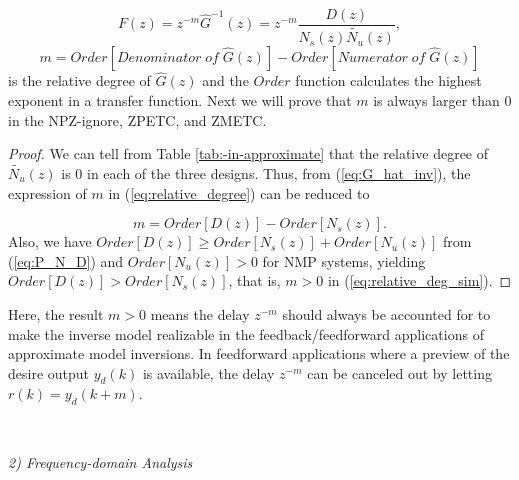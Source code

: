 \documentclass [11pt, proquest] {uwthesis}[2020/02/24]
\begin{document}
\begin{equation}
F(z)=z^{-m}\hat{G}^{-1}(z)=z^{-m}\frac{D(z)}{N_{s}(z)\tilde{N_{u}}(z)},\label{eq:P_hat_inv}
\end{equation}
\begin{equation}
m=Order[Denominator\;of\;\hat{G}(z)]-Order[Numerator\;of\;\hat{G}(z)]\label{eq:relative_degree}
\end{equation}
is the relative degree of $\hat{G}(z)$ and the $Order$ function
calculates the highest exponent in a transfer function. Next we will
prove that $m$ is always larger than 0 in the NPZ-ignore, ZPETC,
and ZMETC.
\begin{proof}
We can tell from Table \ref{tab:-in-approximate} that the relative
degree of $\tilde{N_{u}}(z)$ is 0 in each of the three designs. Thus,
from (\ref{eq:G_hat_inv}), the expression of $m$ in (\ref{eq:relative_degree})
can be reduced to

\begin{equation}
m=Order[D(z)]-Order[N_{s}(z)].\label{eq:relative_deg_sim}
\end{equation}
Also, we have $Order[D(z)]\geq Order[N_{s}(z)]+Order[N_{u}(z)]$ from
(\ref{eq:P_N_D}) and $Order[N_{u}(z)]>0$ for NMP systems, yielding
$Order[D(z)]>Order[N_{s}(z)]$, that is, $m>0$ in (\ref{eq:relative_deg_sim}). 
\end{proof}
Here, the result $m>0$ means the delay $z^{-m}$ should always be
accounted for to make the inverse model realizable in the feedback/feedforward
applications of approximate model inversions. In feedforward applications
where a preview of the desire output $y_{d}(k)$ is available, the
delay $z^{-m}$ can be canceled out by letting $r(k)=y_{d}(k+m)$.

\

\noindent \emph{2) Frequency-domain Analysis}
\end{document}
